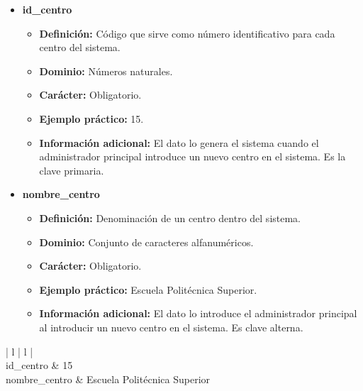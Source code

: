 \begin{description}
   \begin{itemize}
    \item \textbf{id\_centro}
      \begin{itemize}
         \item \textbf{Definición:} Código que sirve como número identificativo
               para cada centro del sistema.
         \item \textbf{Dominio:} Números naturales.
         \item \textbf{Carácter:} Obligatorio.
         \item \textbf{Ejemplo práctico:} 15.
         \item \textbf{Información adicional:} El dato lo genera el sistema
               cuando el administrador principal introduce un nuevo centro en
               el sistema. Es la clave primaria.
      \end{itemize}
   \item \textbf{nombre\_centro}
      \begin{itemize}
         \item \textbf{Definición:} Denominación de un centro dentro del sistema.
         \item \textbf{Dominio:} Conjunto de caracteres alfanuméricos.
         \item \textbf{Carácter:} Obligatorio.
         \item \textbf{Ejemplo práctico:} Escuela Politécnica Superior.
         \item \textbf{Información adicional:} El dato lo introduce el
         administrador principal al introducir un nuevo centro en el sistema. Es
         clave alterna.
      \end{itemize}
   \end{itemize}

   \item[Ejemplo práctico]

   \item \begin{center}
            \begin{tabular}{ | l | l | }
            \hline
             \\
            \hline
            id\_centro & 15 \\
            \hline
            nombre\_centro & Escuela Politécnica Superior \\
            \hline
            \end{tabular}
         \end{center}
   \end{description}
